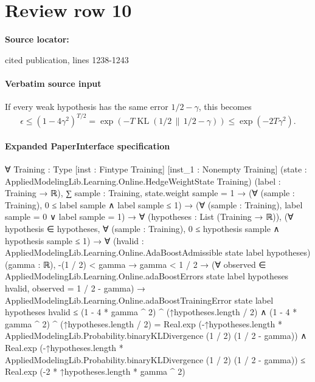 \documentclass[10pt]{article}
\begin{document}
\section*{Review row 10}
\textbf{Source locator:} {\footnotesize\raggedright cited publication, lines 1238-\allowbreak{}1243\par}
\paragraph{Verbatim source input}
\begin{ReviewVerbatim}
If every weak hypothesis has the same error $1/2-\gamma$, this becomes
$$
\epsilon\leq(1-4\gamma^2)^{T/2}
=\exp\left(-T\operatorname{KL}(1/2\,\|\,1/2-\gamma)\right)
\leq\exp(-2T\gamma^2). \tag{22}
$$
\end{ReviewVerbatim}



\paragraph{Expanded PaperInterface specification}
\begin{ReviewVerbatim}
∀ {Training : Type} [inst : Fintype Training] [inst_1 : Nonempty Training]
  (state : AppliedModelingLib.Learning.Online.HedgeWeightState Training) (label : Training → ℝ),
  ∑ sample : Training, state.weight sample = 1 →
    (∀ (sample : Training), 0 ≤ label sample ∧ label sample ≤ 1) →
      (∀ (sample : Training), label sample = 0 ∨ label sample = 1) →
        ∀ (hypotheses : List (Training → ℝ)),
          (∀ hypothesis ∈ hypotheses, ∀ (sample : Training), 0 ≤ hypothesis sample ∧ hypothesis sample ≤ 1) →
            ∀ (hvalid : AppliedModelingLib.Learning.Online.AdaBoostAdmissible state label hypotheses) (gamma : ℝ),
              -(1 / 2) < gamma →
                gamma < 1 / 2 →
                  (∀ observed ∈ AppliedModelingLib.Learning.Online.adaBoostErrors state label hypotheses hvalid,
                      observed = 1 / 2 - gamma) →
                    AppliedModelingLib.Learning.Online.adaBoostTrainingError state label hypotheses hvalid ≤
                        (1 - 4 * gamma ^ 2) ^ (↑hypotheses.length / 2) ∧
                      (1 - 4 * gamma ^ 2) ^ (↑hypotheses.length / 2) =
                          Real.exp
                            (-↑hypotheses.length *
                              AppliedModelingLib.Probability.binaryKLDivergence (1 / 2) (1 / 2 - gamma)) ∧
                        Real.exp
                            (-↑hypotheses.length *
                              AppliedModelingLib.Probability.binaryKLDivergence (1 / 2) (1 / 2 - gamma)) ≤
                          Real.exp (-2 * ↑hypotheses.length * gamma ^ 2)
\end{ReviewVerbatim}
\end{document}
